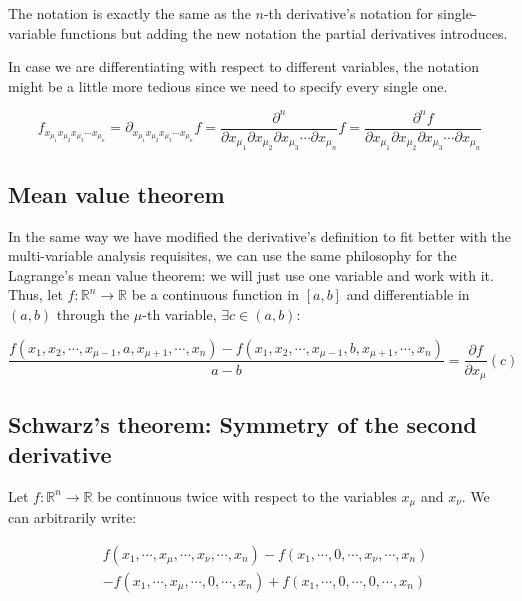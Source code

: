 \documentclass[12pt]{article}
\begin{document}
	The notation is exactly the same as the $n$-th derivative's notation for single-variable functions but adding the new notation the partial derivatives introduces.
	
	In case we are differentiating with respect to different variables, the notation might be a little more tedious since we need to specify every single one.
	
	\[
		f_{x_{\mu_1} x_{\mu_2} x_{\mu_3} \cdots x_{\mu_n}}
		= \partial_{x_{\mu_1} x_{\mu_2} x_{\mu_3} \cdots x_{\mu_n}} f
		= \frac{\partial^n}{\partial x_{\mu_1} \partial x_{\mu_2} \partial x_{\mu_3} \cdots \partial x_{\mu_n}} f
		= \frac{\partial^n f}{\partial x_{\mu_1} \partial x_{\mu_2} \partial x_{\mu_3} \cdots \partial x_{\mu_n}}
	\]
	
	\subsection{Mean value theorem}
	
	In the same way we have modified the derivative's definition to fit better with the multi-variable analysis requisites, we can use the same philosophy for the Lagrange's mean value theorem: we will just use one variable and work with it. Thus, let $f : \mathbb{R}^n \to \mathbb{R}$ be a continuous function in $[a, b]$ and differentiable in $(a, b)$ through the $\mu$-th variable, $\exists c \in (a, b):$
	
	\[
		\frac{f(x_1, x_2, \cdots, x_{\mu - 1}, a, x_{\mu + 1}, \cdots, x_n) - f(x_1, x_2, \cdots, x_{\mu - 1}, b, x_{\mu + 1}, \cdots, x_n)}{a - b}
		= \frac{\partial f}{\partial x_\mu}(c)
	\]
	
	\subsection{Schwarz's theorem: Symmetry of the second derivative}
	
	Let $f : \mathbb{R}^n \to \mathbb{R}$ be continuous twice with respect to the variables $x_\mu$ and $x_\nu$. We can arbitrarily write:
	
	\[
		\begin{aligned}
			& f(x_1, \cdots, x_\mu, \cdots, x_\nu, \cdots, x_n) - f(x_1, \cdots, 0, \cdots, x_\nu, \cdots, x_n)
			\\
			& - f(x_1, \cdots, x_\mu, \cdots, 0, \cdots, x_n) + f(x_1, \cdots, 0, \cdots, 0, \cdots, x_n)
		\end{aligned}
	\]
	
\end{document}
